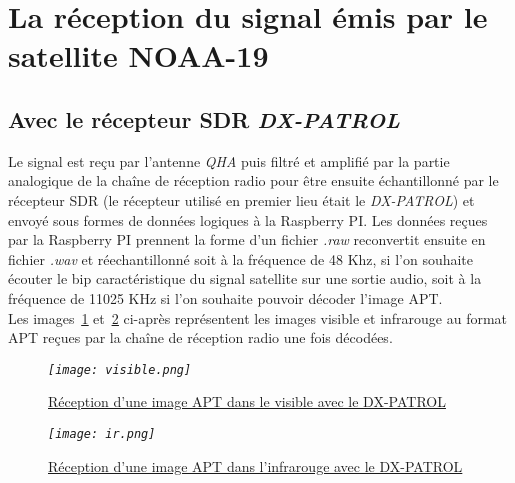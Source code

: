\documentclass[12pt,fleqn]{book} %
\begin{document}
\section{La réception du signal émis par le satellite NOAA-19}
\subsection{Avec le récepteur SDR \emph{DX-PATROL}}
Le signal est reçu par l'antenne \emph{QHA} puis filtré et amplifié par la partie analogique de la chaîne de réception radio pour être ensuite échantillonné par le récepteur SDR (le récepteur utilisé en premier lieu était le \emph{DX-PATROL}) et envoyé sous formes de données logiques à la Raspberry PI. Les données reçues par la Raspberry PI prennent la forme d'un fichier \emph{.raw} reconvertit ensuite en fichier \emph{.wav} et réechantillonné soit à la fréquence de 48 Khz, si l'on souhaite écouter le bip caractéristique du signal satellite sur une sortie audio, soit à la fréquence de 11025 KHz si l'on souhaite pouvoir décoder l'image APT.
~\\Les images~\underline{\color{blue}\ref{visible}} et~\underline{\color{blue}\ref{ir}} ci-après représentent les images visible et infrarouge au format APT reçues par la chaîne de réception radio une fois décodées.
\begin{figure}[H]
	\centering
	\itshape
	\texttt{[image: visible.png]}
	\caption{\label{visible} \underline{Réception d'une image APT dans le visible avec le DX-PATROL}}
\end{figure}
\begin{figure}[H]
	\centering
	\itshape
	\texttt{[image: ir.png]}
	\caption{\label{ir} \underline{Réception d'une image APT dans l'infrarouge avec le DX-PATROL}}
\end{figure}
\end{document}
